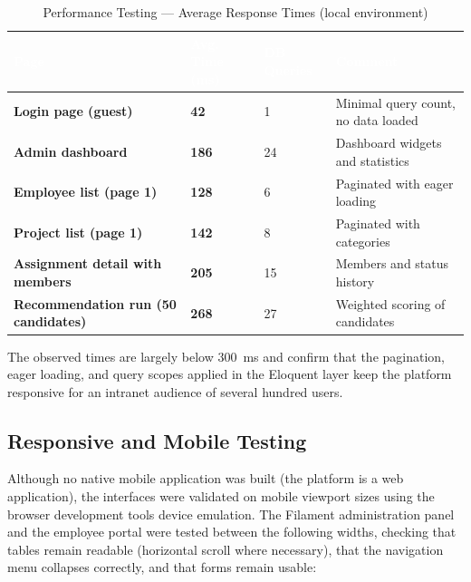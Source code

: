 \documentclass{bts-report}
\begin{document}
\begin{table}[H]
  \centering
  \caption{Performance Testing --- Average Response Times (local environment)}
  \vspace{0.2cm}
  \begin{tabularx}{\textwidth}{|>{\bfseries}p{5.2cm}|>{\bfseries}p{3.0cm}|p{3.4cm}|X|}
    \hline
    \rowcolor{tableheader}
    \textcolor{white}{\textbf{Page}} & \textcolor{white}{\textbf{Avg. Time (ms)}} & \textcolor{white}{\textbf{DB Queries}} & \textcolor{white}{\textbf{Comment}} \\
    \hline
    Login page (guest) & 42 & 1 & Minimal query count, no data loaded \\
    \hline
    Admin dashboard & 186 & 24 & Dashboard widgets and statistics \\
    \hline
    Employee list (page 1) & 128 & 6 & Paginated with eager loading \\
    \hline
    Project list (page 1) & 142 & 8 & Paginated with categories \\
    \hline
    Assignment detail with members & 205 & 15 & Members and status history \\
    \hline
    Recommendation run (50 candidates) & 268 & 27 & Weighted scoring of candidates \\
    \hline
  \end{tabularx}
\end{table}

The observed times are largely below 300~ms and confirm that the pagination, eager loading, and query scopes applied in the Eloquent layer keep the platform responsive for an intranet audience of several hundred users.

\subsection{Responsive and Mobile Testing}
Although no native mobile application was built (the platform is a web application), the interfaces were validated on mobile viewport sizes using the browser development tools device emulation. The Filament administration panel and the employee portal were tested between the following widths, checking that tables remain readable (horizontal scroll where necessary), that the navigation menu collapses correctly, and that forms remain usable:
\end{document}
